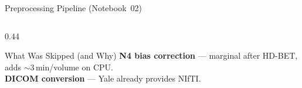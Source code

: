 \documentclass[aspectratio=169, dvipsnames]{beamer}
\begin{document}
\begin{frame}{Preprocessing Pipeline (Notebook~02)}
\begin{columns}
\begin{column}{0.44\textwidth}
            \vspace{0.3em}

            \begin{block}{\small What Was Skipped (and Why)}
                \scriptsize
                \textbf{N4 bias correction} — marginal after HD-BET, adds $\sim$3\,min/volume on CPU.\\
                \textbf{DICOM conversion} — Yale already provides NIfTI.
            \end{block}
        \end{column}
    \end{columns}
\end{frame}

\end{document}
